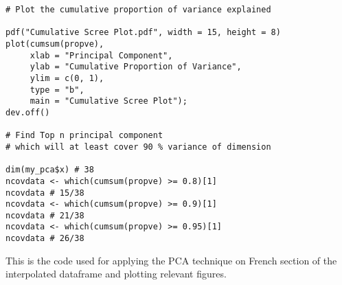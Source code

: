 \begin{verbatim}
# Plot the cumulative proportion of variance explained

pdf("Cumulative Scree Plot.pdf", width = 15, height = 8) 
plot(cumsum(propve),
     xlab = "Principal Component",
     ylab = "Cumulative Proportion of Variance",
     ylim = c(0, 1), 
     type = "b",
     main = "Cumulative Scree Plot");
dev.off()

# Find Top n principal component
# which will at least cover 90 % variance of dimension

dim(my_pca$x) # 38
ncovdata <- which(cumsum(propve) >= 0.8)[1] 
ncovdata # 15/38
ncovdata <- which(cumsum(propve) >= 0.9)[1] 
ncovdata # 21/38
ncovdata <- which(cumsum(propve) >= 0.95)[1] 
ncovdata # 26/38
\end{verbatim}

This is the code used for applying the PCA technique on French section of the interpolated dataframe and plotting relevant figures.
